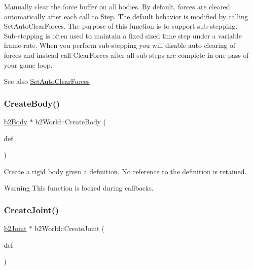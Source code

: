 Manually clear the force buffer on all bodies. By default, forces are cleared automatically after each call to Step. The default behavior is modified by calling Set\+Auto\+Clear\+Forces. The purpose of this function is to support sub-\/stepping. Sub-\/stepping is often used to maintain a fixed sized time step under a variable frame-\/rate. When you perform sub-\/stepping you will disable auto clearing of forces and instead call Clear\+Forces after all sub-\/steps are complete in one pass of your game loop. \begin{DoxySeeAlso}{See also}
\mbox{\hyperlink{classb2World_aa2bced28ddef5bbb00ed5666e5e9f620}{Set\+Auto\+Clear\+Forces}} 
\end{DoxySeeAlso}
\mbox{\label{classb2World_a2eb36e967e43294bfa03ec3d177c2dae}} 
\subsubsection{\texorpdfstring{Create\+Body()}{CreateBody()}}
{\footnotesize\ttfamily \mbox{\hyperlink{classb2Body}{b2\+Body}} $\ast$ b2\+World\+::\+Create\+Body (\begin{DoxyParamCaption}\item[{const \mbox{\hyperlink{structb2BodyDef}{b2\+Body\+Def}} $\ast$}]{def }\end{DoxyParamCaption})}

Create a rigid body given a definition. No reference to the definition is retained. \begin{DoxyWarning}{Warning}
This function is locked during callbacks. 
\end{DoxyWarning}
\mbox{\label{classb2World_a5cba9d0653149eb62504154e6fb35021}} 
\subsubsection{\texorpdfstring{Create\+Joint()}{CreateJoint()}}
{\footnotesize\ttfamily \mbox{\hyperlink{classb2Joint}{b2\+Joint}} $\ast$ b2\+World\+::\+Create\+Joint (\begin{DoxyParamCaption}\item[{const \mbox{\hyperlink{structb2JointDef}{b2\+Joint\+Def}} $\ast$}]{def }\end{DoxyParamCaption})}

